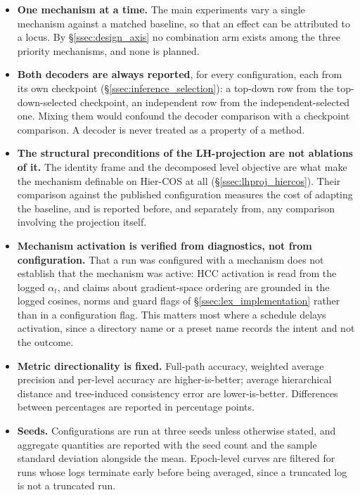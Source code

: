 \begin{itemize}
    \item \textbf{One mechanism at a time.} The main experiments vary a single
    mechanism against a matched baseline, so that an effect can be attributed to a
    locus. By \S\ref{ssec:design_axis} no combination arm exists among the three
    priority mechanisms, and none is planned.
    \item \textbf{Both decoders are always reported}, for every configuration,
    each from its own checkpoint (\S\ref{ssec:inference_selection}): a top-down row
    from the top-down-selected checkpoint, an independent row from the
    independent-selected one. Mixing them would confound the decoder comparison
    with a checkpoint comparison. A decoder is never treated as a property of a
    method.
    \item \textbf{The structural preconditions of the LH-projection are not
    ablations of it.} The identity frame and the decomposed level objective are
    what make the mechanism definable on Hier-COS at all
    (\S\ref{ssec:lhproj_hiercos}). Their comparison against the published
    configuration measures the cost of adapting the baseline, and is reported
    before, and separately from, any comparison involving the projection itself.
    \item \textbf{Mechanism activation is verified from diagnostics, not from
    configuration.} That a run was configured with a mechanism does not establish
    that the mechanism was active: HCC activation is read from the logged
    $\alpha_t$, and claims about gradient-space ordering are grounded in the logged
    cosines, norms and guard flags of \S\ref{ssec:lex_implementation} rather than
    in a configuration flag. This matters most where a schedule delays activation,
    since a directory name or a preset name records the intent and not the outcome.
    \item \textbf{Metric directionality is fixed.} Full-path accuracy, weighted
    average precision and per-level accuracy are higher-is-better; average
    hierarchical distance and tree-induced consistency error are lower-is-better.
    Differences between percentages are reported in percentage points.
    \item \textbf{Seeds.} Configurations are run at three seeds unless otherwise
    stated, and aggregate quantities are reported with the seed count and the
    sample standard deviation alongside the mean.
    Epoch-level curves are filtered for runs whose logs terminate early before
    being averaged, since a truncated log is not a truncated run.
\end{itemize}
